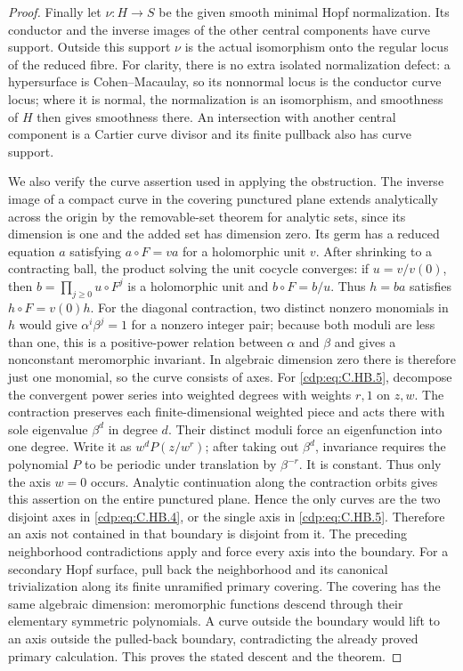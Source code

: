 \begin{proof}
Finally let $\nu:H\to S$ be the
given smooth minimal Hopf
normalization. Its conductor
and the inverse images of
the other central components
have curve support. Outside
this support $\nu$ is the
actual isomorphism onto the
regular locus of the reduced
fibre. For clarity, there
is no extra isolated
normalization defect: a
hypersurface is Cohen--Macaulay,
so its nonnormal locus is
the conductor curve locus;
where it is normal, the
normalization is an isomorphism,
and smoothness of $H$ then
gives smoothness there.
An intersection with another
central component is a
Cartier curve divisor and
its finite pullback also
has curve support.

We also verify the curve assertion
used in applying the obstruction.
The inverse image of a compact
curve in the covering punctured
plane extends analytically across
the origin by the removable-set
theorem for analytic sets, since
its dimension is one and the
added set has dimension zero.
Its germ has a reduced equation
$a$ satisfying $a\circ F=v a$
for a holomorphic unit $v$.
After shrinking to a contracting
ball, the product solving the
unit cocycle converges: if
$u=v/v(0)$, then
$b=\prod_{j\ge0}u\circ F^j$
is a holomorphic unit and
$b\circ F=b/u$.
Thus $h=ba$ satisfies
$h\circ F=v(0)h$.
For the diagonal contraction,
two distinct nonzero monomials
in $h$ would give
$\alpha^i\beta^j=1$ for a
nonzero integer pair; because
both moduli are less than one,
this is a positive-power
relation between $\alpha$
and $\beta$ and gives a
nonconstant meromorphic
invariant. In algebraic
dimension zero there is
therefore just one monomial,
so the curve consists of
axes. For \eqref{cdp:eq:C.HB.5}, decompose
the convergent power series
into weighted degrees with
weights $r,1$ on $z,w$.
The contraction preserves
each finite-dimensional
weighted piece and acts
there with sole eigenvalue
$\beta^d$ in degree $d$.
Their distinct moduli force
an eigenfunction into one
degree. Write it as
$w^dP(z/w^r)$; after taking
out $\beta^d$, invariance
requires the polynomial
$P$ to be periodic under
translation by $\beta^{-r}$.
It is constant. Thus only
the axis $w=0$ occurs.
Analytic continuation along
the contraction orbits
gives this assertion on
the entire punctured plane.
Hence the only curves
are the two disjoint axes
in \eqref{cdp:eq:C.HB.4}, or the single
axis in \eqref{cdp:eq:C.HB.5}.
Therefore an axis not
contained in that boundary
is disjoint from it. The
preceding neighborhood
contradictions apply and
force every axis into the
boundary. For a secondary
Hopf surface, pull back
the neighborhood and its
canonical trivialization
along its finite unramified
primary covering. The
covering has the same
algebraic dimension:
meromorphic functions
descend through their
elementary symmetric
polynomials. A curve
outside the boundary
would lift to an axis
outside the pulled-back
boundary, contradicting
the already proved
primary calculation.
This proves the stated
descent and the theorem.
\end{proof}



